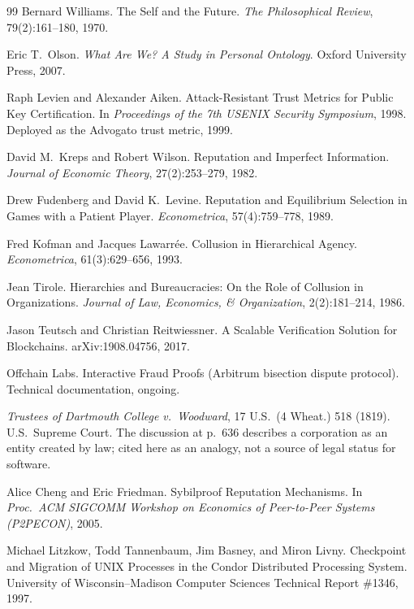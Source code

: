 \documentclass[11pt,a4paper]{article}
\theoremstyle{definition}
\newcounter{protocol}[section]
\begin{document}
\begin{thebibliography}{99}
Bernard Williams.
\newblock The Self and the Future.
\newblock \textit{The Philosophical Review}, 79(2):161--180, 1970.

Eric T.\ Olson.
\newblock \textit{What Are We? A Study in Personal Ontology}.
\newblock Oxford University Press, 2007.

Raph Levien and Alexander Aiken.
\newblock Attack-Resistant Trust Metrics for Public Key Certification.
\newblock In \textit{Proceedings of the 7th USENIX Security Symposium}, 1998.
\newblock Deployed as the Advogato trust metric, 1999.

David M.\ Kreps and Robert Wilson.
\newblock Reputation and Imperfect Information.
\newblock \textit{Journal of Economic Theory}, 27(2):253--279, 1982.

Drew Fudenberg and David K.\ Levine.
\newblock Reputation and Equilibrium Selection in Games with a Patient Player.
\newblock \textit{Econometrica}, 57(4):759--778, 1989.

Fred Kofman and Jacques Lawarrée.
\newblock Collusion in Hierarchical Agency.
\newblock \textit{Econometrica}, 61(3):629--656, 1993.

Jean Tirole.
\newblock Hierarchies and Bureaucracies: On the Role of Collusion in Organizations.
\newblock \textit{Journal of Law, Economics, \& Organization}, 2(2):181--214, 1986.

Jason Teutsch and Christian Reitwiessner.
\newblock A Scalable Verification Solution for Blockchains.
\newblock arXiv:1908.04756, 2017.

Offchain Labs.
\newblock Interactive Fraud Proofs (Arbitrum bisection dispute protocol).
\newblock Technical documentation, ongoing.

\textit{Trustees of Dartmouth College v.\ Woodward}, 17 U.S.\ (4 Wheat.) 518 (1819).
\newblock U.S.\ Supreme Court. The discussion at p.\ 636 describes a corporation as an entity created by law; cited here as an analogy, not a source of legal status for software.

Alice Cheng and Eric Friedman.
\newblock Sybilproof Reputation Mechanisms.
\newblock In \textit{Proc.\ ACM SIGCOMM Workshop on Economics of Peer-to-Peer Systems (P2PECON)}, 2005.

Michael Litzkow, Todd Tannenbaum, Jim Basney, and Miron Livny.
\newblock Checkpoint and Migration of UNIX Processes in the Condor Distributed Processing System.
\newblock University of Wisconsin--Madison Computer Sciences Technical Report \#1346, 1997.


\end{thebibliography}
\end{document}

